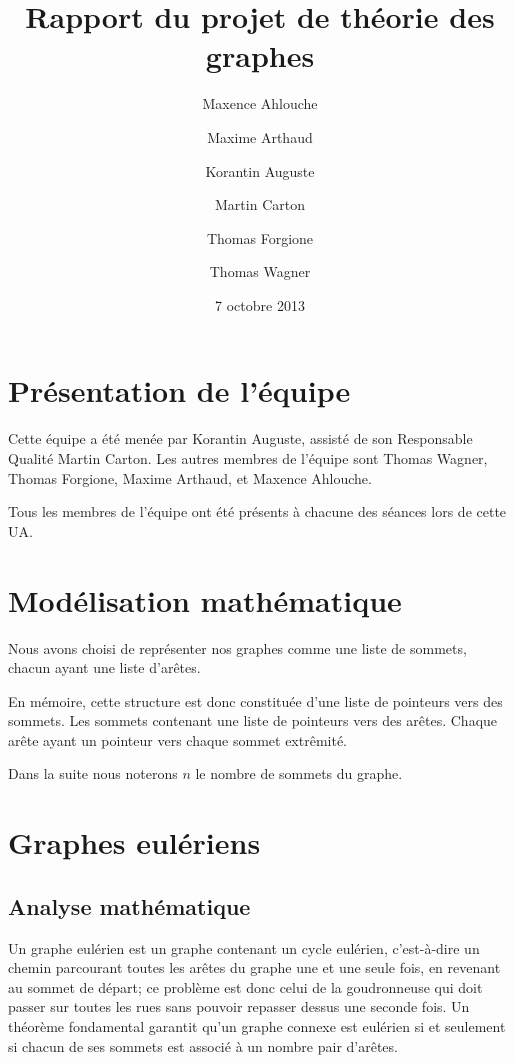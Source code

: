\documentclass{scrartcl}
\begin{document}
\title{Rapport du projet de théorie des graphes}
\author{Maxence Ahlouche \and Maxime Arthaud \and Korantin Auguste
          \and Martin Carton \and Thomas Forgione \and Thomas Wagner}
\date{7 octobre 2013}
\maketitle
\newpage
\tableofcontents
\newpage

\section{Présentation de l'équipe}
  Cette équipe a été menée par Korantin Auguste, assisté de son Responsable
  Qualité Martin Carton. Les autres membres de l'équipe sont Thomas Wagner,
  Thomas Forgione, Maxime Arthaud, et Maxence Ahlouche.
  
  Tous les membres de l'équipe ont été présents à chacune des séances lors de
  cette UA.

\section{Modélisation mathématique}
  Nous avons choisi de représenter nos graphes comme une liste de sommets,
  chacun ayant une liste d'arêtes.

  En mémoire, cette structure est donc constituée d'une liste de pointeurs
  vers des sommets. Les sommets contenant une liste de pointeurs vers des
  arêtes. Chaque arête ayant un pointeur vers chaque sommet extrêmité.

  Dans la suite nous noterons $n$ le nombre de sommets du graphe.

\section{Graphes eulériens}
  \subsection{Analyse mathématique}
    Un graphe eulérien est un graphe contenant un cycle eulérien, c'est-à-dire
    un chemin parcourant toutes les arêtes du graphe une et une seule fois, en
    revenant au sommet de départ; ce problème est donc celui de la goudronneuse
    qui doit passer sur toutes les rues sans pouvoir repasser dessus une
    seconde fois. Un théorème fondamental garantit qu'un graphe connexe est
    eulérien si et seulement si chacun de ses sommets est associé à un nombre
    pair d'arêtes.
\end{document}
